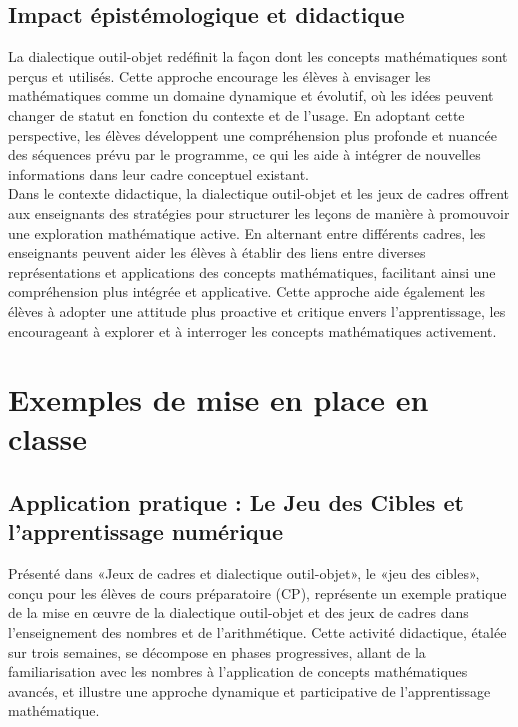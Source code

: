 \subsection{Impact épistémologique et didactique}

La dialectique outil-objet redéfinit la façon dont les concepts mathématiques sont perçus et utilisés.
Cette approche encourage les élèves à envisager les mathématiques comme un domaine dynamique et évolutif,
où les idées peuvent changer de statut en fonction du contexte et de l'usage.
En adoptant cette perspective,
les élèves développent une compréhension plus profonde et nuancée des séquences prévu par le programme,
ce qui les aide à intégrer de nouvelles informations dans leur cadre conceptuel existant.\\

Dans le contexte didactique,
la dialectique outil-objet et les jeux de cadres offrent aux enseignants des stratégies pour structurer les leçons de manière à promouvoir une exploration mathématique active.
En alternant entre différents cadres,
les enseignants peuvent aider les élèves à établir des liens entre diverses représentations et applications des concepts mathématiques,
facilitant ainsi une compréhension plus intégrée et applicative.
Cette approche aide également les élèves à adopter une attitude plus proactive et critique envers l'apprentissage,
les encourageant à explorer et à interroger les concepts mathématiques activement.

\section{Exemples de mise en place en classe}

\subsection{Application pratique : Le Jeu des Cibles et l'apprentissage numérique}

Présenté dans «Jeux de cadres et dialectique outil-objet»,
le «jeu des cibles»,
conçu pour les élèves de cours préparatoire (CP),
représente un exemple pratique de la mise en œuvre de la dialectique outil-objet et des jeux de cadres dans l'enseignement des nombres et de l'arithmétique.
Cette activité didactique,
étalée sur trois semaines,
se décompose en phases progressives,
allant de la familiarisation avec les nombres à l'application de concepts mathématiques avancés,
et illustre une approche dynamique et participative de l'apprentissage mathématique.\\

